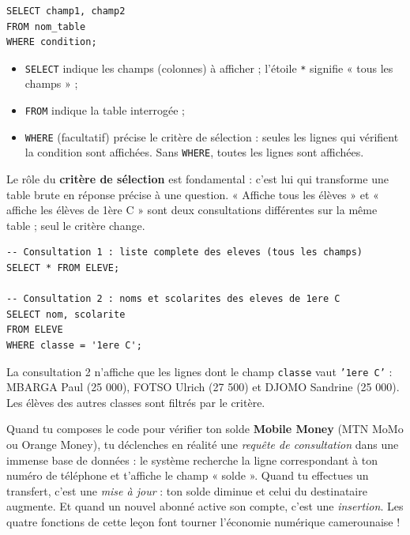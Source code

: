 \documentclass[11pt]{article}
\newcommand{\cle}[1]{{\popxbold\color{popdark}#1}}
\begin{document}
\begin{propriete}
\begin{lstlisting}
SELECT champ1, champ2
FROM nom_table
WHERE condition;
\end{lstlisting}
\begin{itemize}
\item \texttt{SELECT} indique les champs (colonnes) à afficher ; l'étoile \texttt{*} signifie « tous les champs » ;
\item \texttt{FROM} indique la table interrogée ;
\item \texttt{WHERE} (facultatif) précise le \cle{critère de sélection} : seules les lignes qui vérifient la condition sont affichées. Sans \texttt{WHERE}, toutes les lignes sont affichées.
\end{itemize}
\end{propriete}

Le rôle du \textbf{critère de sélection} est fondamental : c'est lui qui transforme une table brute en réponse précise à une question. « Affiche tous les élèves » et « affiche les élèves de 1ère C » sont deux consultations différentes sur la même table ; seul le critère change.

\begin{exemplebox}
\begin{lstlisting}
-- Consultation 1 : liste complete des eleves (tous les champs)
SELECT * FROM ELEVE;

-- Consultation 2 : noms et scolarites des eleves de 1ere C
SELECT nom, scolarite
FROM ELEVE
WHERE classe = '1ere C';
\end{lstlisting}
La consultation 2 n'affiche que les lignes dont le champ \texttt{classe} vaut \texttt{'1ere C'} : MBARGA Paul (25 000), FOTSO Ulrich (27 500) et DJOMO Sandrine (25 000). Les élèves des autres classes sont filtrés par le critère.
\end{exemplebox}

\begin{savaistu}
Quand tu composes le code pour vérifier ton solde \textbf{Mobile Money} (MTN MoMo ou Orange Money), tu déclenches en réalité une \emph{requête de consultation} dans une immense base de données : le système recherche la ligne correspondant à ton numéro de téléphone et t'affiche le champ « solde ». Quand tu effectues un transfert, c'est une \emph{mise à jour} : ton solde diminue et celui du destinataire augmente. Et quand un nouvel abonné active son compte, c'est une \emph{insertion}. Les quatre fonctions de cette leçon font tourner l'économie numérique camerounaise !
\end{savaistu}
\end{document}
